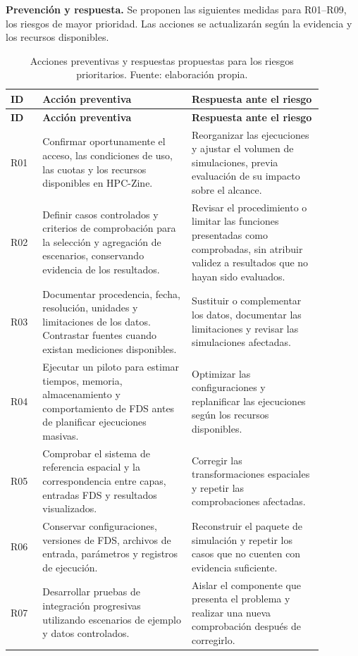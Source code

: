 \textbf{Prevención y respuesta.} Se proponen las siguientes medidas para R01--R09, los riesgos de mayor prioridad. Las acciones se actualizarán según la evidencia y los recursos disponibles.

\begin{longtable}{|p{0.09\linewidth}|p{0.42\linewidth}|p{0.37\linewidth}|}
\caption{Acciones preventivas y respuestas propuestas para los riesgos prioritarios. Fuente: elaboración propia.}\\
\hline
\textbf{ID} & \textbf{Acción preventiva} & \textbf{Respuesta ante el riesgo}\\\hline
\endfirsthead
\hline
\textbf{ID} & \textbf{Acción preventiva} & \textbf{Respuesta ante el riesgo}\\\hline
\endhead
R01 & Confirmar oportunamente el acceso, las condiciones de uso, las cuotas y los recursos disponibles en HPC-Zine. & Reorganizar las ejecuciones y ajustar el volumen de simulaciones, previa evaluación de su impacto sobre el alcance.\\\hline
R02 & Definir casos controlados y criterios de comprobación para la selección y agregación de escenarios, conservando evidencia de los resultados. & Revisar el procedimiento o limitar las funciones presentadas como comprobadas, sin atribuir validez a resultados que no hayan sido evaluados.\\\hline
R03 & Documentar procedencia, fecha, resolución, unidades y limitaciones de los datos. Contrastar fuentes cuando existan mediciones disponibles. & Sustituir o complementar los datos, documentar las limitaciones y revisar las simulaciones afectadas.\\\hline
R04 & Ejecutar un piloto para estimar tiempos, memoria, almacenamiento y comportamiento de FDS antes de planificar ejecuciones masivas. & Optimizar las configuraciones y replanificar las ejecuciones según los recursos disponibles.\\\hline
R05 & Comprobar el sistema de referencia espacial y la correspondencia entre capas, entradas FDS y resultados visualizados. & Corregir las transformaciones espaciales y repetir las comprobaciones afectadas.\\\hline
R06 & Conservar configuraciones, versiones de FDS, archivos de entrada, parámetros y registros de ejecución. & Reconstruir el paquete de simulación y repetir los casos que no cuenten con evidencia suficiente.\\\hline
R07 & Desarrollar pruebas de integración progresivas utilizando escenarios de ejemplo y datos controlados. & Aislar el componente que presenta el problema y realizar una nueva comprobación después de corregirlo.\\\hline

\end{longtable}
